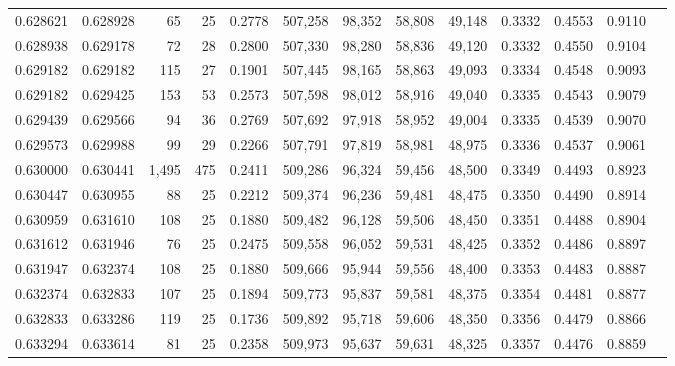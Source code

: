 \begin{tabular}{rrrrrrrrrrrrr}
0.628621 & 0.628928 &    65 &  25 &                                     0.2778 & 507,258 &  98,352 &  58,808 &  49,148 & 0.3332 & 0.4553 & 0.9110 \\
0.628938 & 0.629178 &    72 &  28 &                                     0.2800 & 507,330 &  98,280 &  58,836 &  49,120 & 0.3332 & 0.4550 & 0.9104 \\
0.629182 & 0.629182 &   115 &  27 &                                     0.1901 & 507,445 &  98,165 &  58,863 &  49,093 & 0.3334 & 0.4548 & 0.9093 \\
0.629182 & 0.629425 &   153 &  53 &                                     0.2573 & 507,598 &  98,012 &  58,916 &  49,040 & 0.3335 & 0.4543 & 0.9079 \\
0.629439 & 0.629566 &    94 &  36 &                                     0.2769 & 507,692 &  97,918 &  58,952 &  49,004 & 0.3335 & 0.4539 & 0.9070 \\
0.629573 & 0.629988 &    99 &  29 &                                     0.2266 & 507,791 &  97,819 &  58,981 &  48,975 & 0.3336 & 0.4537 & 0.9061 \\
0.630000 & 0.630441 & 1,495 & 475 &                                     0.2411 & 509,286 &  96,324 &  59,456 &  48,500 & 0.3349 & 0.4493 & 0.8923 \\
0.630447 & 0.630955 &    88 &  25 &                                     0.2212 & 509,374 &  96,236 &  59,481 &  48,475 & 0.3350 & 0.4490 & 0.8914 \\
0.630959 & 0.631610 &   108 &  25 &                                     0.1880 & 509,482 &  96,128 &  59,506 &  48,450 & 0.3351 & 0.4488 & 0.8904 \\
0.631612 & 0.631946 &    76 &  25 &                                     0.2475 & 509,558 &  96,052 &  59,531 &  48,425 & 0.3352 & 0.4486 & 0.8897 \\
0.631947 & 0.632374 &   108 &  25 &                                     0.1880 & 509,666 &  95,944 &  59,556 &  48,400 & 0.3353 & 0.4483 & 0.8887 \\
0.632374 & 0.632833 &   107 &  25 &                                     0.1894 & 509,773 &  95,837 &  59,581 &  48,375 & 0.3354 & 0.4481 & 0.8877 \\
0.632833 & 0.633286 &   119 &  25 &                                     0.1736 & 509,892 &  95,718 &  59,606 &  48,350 & 0.3356 & 0.4479 & 0.8866 \\
0.633294 & 0.633614 &    81 &  25 &                                     0.2358 & 509,973 &  95,637 &  59,631 &  48,325 & 0.3357 & 0.4476 & 0.8859 \\

\end{tabular}
